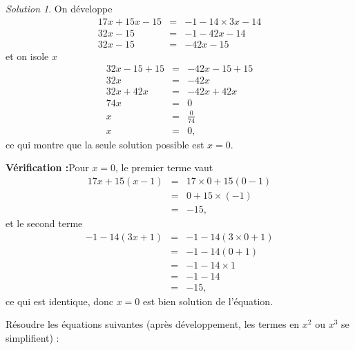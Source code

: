 \documentclass[14pt]{article}
\theoremstyle{remark}
\newtheorem*{sol}{Solution}
\newcounter{n}
\theoremstyle{plain}
\begin{document}
\begin{sol}
On développe 
\begin{eqnarray*}
17x+ 15x-15 &=& -1 - 14\times 3x -14\\
32x-15 &=& -1-42x-14\\
32x-15 &=& -42x-15
\end{eqnarray*}
 et on isole $x$
\begin{eqnarray*}
32x-15+15 &=& -42x-15+15\\
32x &=& -42x\\
32x+42x&=& -42x+42x \\
74x&=& 0\\
x&=&\frac0{74}\\
x&=&0,
\end{eqnarray*}ce qui montre que la seule solution possible est $x=0$. 

\textbf{Vérification :}Pour $x=0$, le premier terme vaut 
\begin{eqnarray*}
17x+15(x-1)&=& 17\times 0 + 15(0-1) \\ 
&=& 0 + 15\times (-1)\\
&=& -15,
\end{eqnarray*} et le second terme 
\begin{eqnarray*}
-1-14(3x+1) &=& -1-14(3\times0+1)\\
&=& -1-14(0+1) \\
&=& -1 -14\times 1\\
&=& -1-14 \\
&=&-15,\end{eqnarray*}
ce qui est identique, donc $x=0$ est bien solution de l'équation. 
\end{sol}

Résoudre les équations suivantes (après développement, les termes en $x^2$ ou $x^3$ se simplifient) : 
\end{document}
